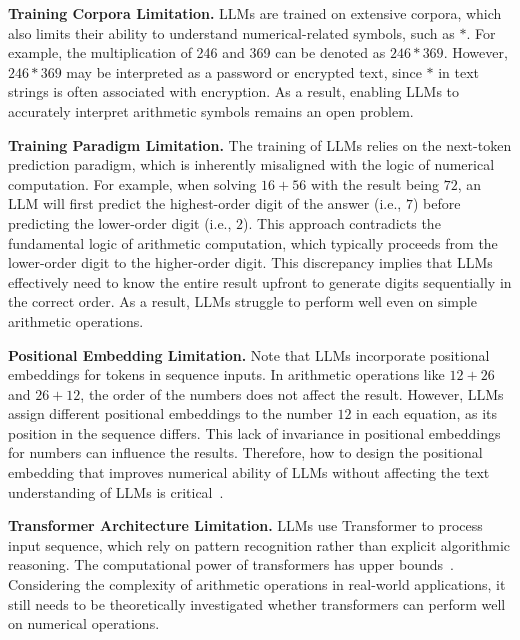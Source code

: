 \noindent \textbf{Training Corpora Limitation.}
LLMs are trained on extensive corpora, which also limits their ability to understand numerical-related symbols, such as $*$.
For example, the multiplication of 246 and 369 can be denoted as $246*369$.
However, $246*369$ may be interpreted as a password or encrypted text, since $*$ in text strings is often associated with encryption.
As a result, enabling LLMs to accurately interpret arithmetic symbols remains an open problem.


\noindent \textbf{Training Paradigm Limitation.}
The training of LLMs relies on the next-token prediction paradigm, which is inherently misaligned with the logic of numerical computation.
For example, when solving $16 + 56$ with the result being $72$, an LLM will first predict the highest-order digit of the answer (i.e., $7$) before predicting the lower-order digit (i.e., $2$). This approach contradicts the fundamental logic of arithmetic computation, which typically proceeds from the lower-order digit to the higher-order digit.
This discrepancy implies that LLMs effectively need to know the entire result upfront to generate digits sequentially in the correct order. As a result, LLMs struggle to perform well even on simple arithmetic operations.

\noindent \textbf{Positional Embedding Limitation.}
Note that LLMs incorporate positional embeddings for  tokens in sequence inputs. In arithmetic operations like $12 + 26$ and $26 + 12$, the order of the numbers does not affect the result. However, LLMs assign different positional embeddings to the number $12$ in each equation, as its position in the sequence differs. 
This lack of invariance in positional embeddings for numbers can influence the results.
Therefore, how to design the positional embedding that improves numerical ability of LLMs without affecting the text understanding  of LLMs is critical~\cite{mcleish2024transformers,golovneva2024contextual}.



\noindent \textbf{Transformer Architecture Limitation.}
LLMs use Transformer to process input sequence, which rely on pattern recognition rather than explicit algorithmic reasoning.
The computational power of transformers has upper bounds~\cite{merrill2023parallelism}. Considering the complexity of arithmetic operations in real-world applications, it still needs to be theoretically investigated whether transformers can perform well on numerical operations.
